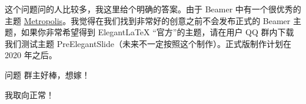 	\begin{solution}
	这个问题问的人比较多，我这里给个明确的答案。由于 Beamer 中有一个很优秀的主题 \href{https://github.com/matze/mtheme}{Metropolis}。我觉得在我们找到非常好的创意之前不会发布正式的 Beamer 主题，如果你非常希望得到 Elegant\LaTeX{} “官方”的主题，请在用户 QQ 群内下载我们测试主题 PreElegantSlide（未来不一定按照这个制作）。正式版制作计划在 2020 年之后。
	\end{solution}
	
	\begin{custom}{问题}
	群主好棒，想嫁！
	\end{custom}
	
	\begin{solution}
	我取向正常！
	\end{solution}